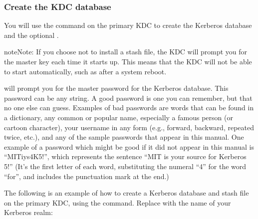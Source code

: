 \documentclass[letterpaper,10pt,english]{sphinxmanual}
\begin{document}
\subsubsection{Create the KDC database}
\label{\detokenize{admin/install_kdc:create-the-kdc-database}}\label{\detokenize{admin/install_kdc:create-db}}
\sphinxAtStartPar
You will use the {\hyperref[\detokenize{admin/admin_commands/kdb5_util:kdb5-util-8}]{}} command on the primary KDC to
create the Kerberos database and the optional .

\begin{sphinxadmonition}{note}{Note:}
\sphinxAtStartPar
If you choose not to install a stash file, the KDC will
prompt you for the master key each time it starts up.  This
means that the KDC will not be able to start automatically,
such as after a system reboot.
\end{sphinxadmonition}

\sphinxAtStartPar
{\hyperref[\detokenize{admin/admin_commands/kdb5_util:kdb5-util-8}]{}} will prompt you for the master password for the
Kerberos database.  This password can be any string.  A good password
is one you can remember, but that no one else can guess.  Examples of
bad passwords are words that can be found in a dictionary, any common
or popular name, especially a famous person (or cartoon character),
your username in any form (e.g., forward, backward, repeated twice,
etc.), and any of the sample passwords that appear in this manual.
One example of a password which might be good if it did not appear in
this manual is “MITiys4K5!”, which represents the sentence “MIT is
your source for Kerberos 5!”  (It’s the first letter of each word,
substituting the numeral “4” for the word “for”, and includes the
punctuation mark at the end.)

\sphinxAtStartPar
The following is an example of how to create a Kerberos database and
stash file on the primary KDC, using the {\hyperref[\detokenize{admin/admin_commands/kdb5_util:kdb5-util-8}]{}} command.
Replace  with the name of your Kerberos realm:
\end{document}
